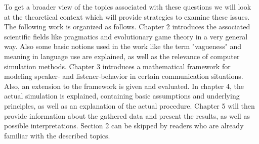 To get a broader view of the topics associated with these questions we will look at the theoretical context which will provide strategies to examine these issues.
The following work is organized as follows. Chapter 2 introduces the associated scientific fields like pragmatics and evolutionary game theory in a very general way. Also some basic notions used in the work like the term "vagueness" and meaning in language use are explained, as well as the relevance of computer simulation methods. Chapter 3 introduces a mathematical framework for modeling speaker- and listener-behavior in certain communication situations. Also, an extension to the framework is given and evaluated. In chapter 4, the actual simulation is explained, containing basic assumptions and underlying principles, as well as an explanation of the actual procedure. Chapter 5 will then provide information about the gathered data and present the results, as well as possible interpretations. Section 2 can be skipped by readers who are already familiar with the described topics.